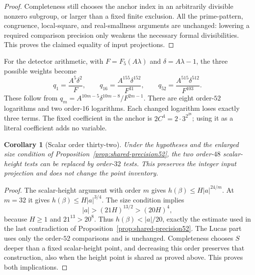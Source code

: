 \documentclass[11pt]{article}
\newtheorem{corollary}[theorem]{Corollary}
\theoremstyle{definition}
\begin{document}
\begin{proof}
Completeness still chooses the anchor index in an arbitrarily
divisible nonzero subgroup, or larger than a fixed finite exclusion.
All the prime-pattern, congruence, local-square, and real-smallness
arguments are unchanged: lowering a required comparison precision
only weakens the necessary formal divisibilities.  This proves the
claimed equality of input projections.
\end{proof}

For the detector arithmetic, with $F=F_5(A\lambda)$ and
$\delta=A\lambda-1$, the three possible weights become
\[
 q_1=\frac{A^5\delta^2}{F},\qquad
 q_{16}=\frac{A^{155}\delta^{152}}{F^{31}},\qquad
 q_{52}=\frac{A^{515}\delta^{512}}{F^{103}}.
\]
These follow from $q_m=A^{10m-5}\delta^{10m-8}/F^{2m-1}$.
There are eight order-$52$ logarithms and two order-$16$
logarithms.  Each changed logarithm loses exactly three terms.
The fixed coefficient in the anchor is $2C^4=2\cdot3^{2^{28}}$;
using it as a literal coefficient adds no variable.

\begin{corollary}[Scalar order thirty-two]
\label{cor:shared-scalar32}
Under the hypotheses and the enlarged size condition of
Proposition~\ref{prop:shared-precision52}, the two order-$48$ scalar-height
tests can be replaced by order-$32$ tests.  This preserves the integer input
projection and does not change the point inventory.
\end{corollary}
\begin{proof}
The scalar-height argument with order $m$ gives
$h(\beta)\le H|a|^{24/m}$.  At $m=32$ it gives
$h(\beta)\le H|a|^{3/4}$.  The size condition implies
\[
 |a|>(21H)^{13/2}>(20H)^4,
\]
because $H\ge1$ and $21^{13}>20^8$.  Thus
$h(\beta)<|a|/20$, exactly the estimate used in the last contradiction
of Proposition~\ref{prop:shared-precision52}.  The Lucas part uses only the
order-$52$ comparisons and is unchanged.  Completeness chooses $S$ deeper
than a fixed scalar-height point, and decreasing this order
preserves that construction, also when the height point is shared as
proved above.  This proves both implications.
\end{proof}
\end{document}
